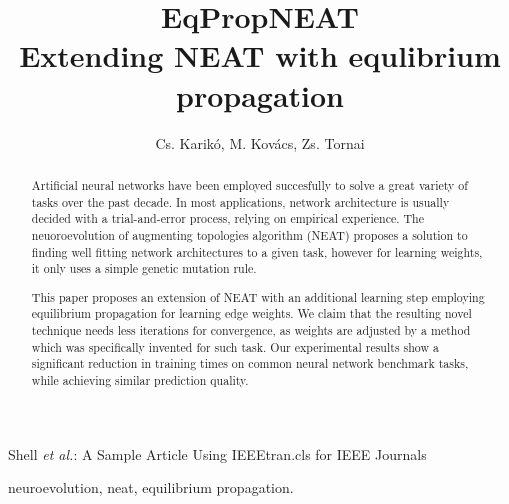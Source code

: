 \documentclass[lettersize,journal]{IEEEtran}
\begin{document}
\title{EqPropNEAT\\Extending NEAT with equlibrium propagation}

\author{Cs. Karikó, M. Kovács, Zs. Tornai
}

%
{Shell \MakeLowercase{\textit{et al.}}: A Sample Article Using IEEEtran.cls for IEEE Journals}


\maketitle

\begin{abstract}
  Artificial neural networks have been employed succesfully to solve a great variety of tasks over the past decade. In most applications, network architecture is usually decided with a trial-and-error process, relying on empirical experience.
  The neuoroevolution of augmenting topologies algorithm (NEAT) proposes a solution to finding well fitting network architectures to a given task, however for learning weights, it only uses a simple genetic mutation rule.

  This paper proposes an extension of NEAT with an additional learning step employing equilibrium propagation for learning edge weights. We claim that the resulting novel technique needs less iterations for convergence, as weights are adjusted by a method which was specifically invented for such task. Our experimental results show a significant reduction in training times on common neural network benchmark tasks, while achieving similar prediction quality.
\end{abstract}



\begin{IEEEkeywords}
neuroevolution, neat, equilibrium propagation.
\end{IEEEkeywords}
\end{document}
